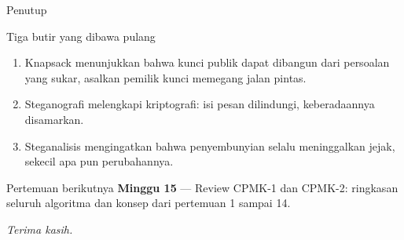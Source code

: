 \documentclass[aspectratio=169,11pt]{beamer}
\begin{document}
\begin{frame}{Penutup}
    \begin{block}{Tiga butir yang dibawa pulang}
        \footnotesize
        \begin{enumerate}
            \item Knapsack menunjukkan bahwa kunci publik dapat dibangun dari
                  persoalan yang sukar, asalkan pemilik kunci memegang jalan
                  pintas.
            \item Steganografi melengkapi kriptografi: isi pesan dilindungi,
                  keberadaannya disamarkan.
            \item Steganalisis mengingatkan bahwa penyembunyian selalu
                  meninggalkan jejak, sekecil apa pun perubahannya.
        \end{enumerate}
    \end{block}
    \vspace{0.2cm}
    \begin{exampleblock}{Pertemuan berikutnya}
        \textbf{Minggu 15} --- Review CPMK-1 dan CPMK-2: ringkasan seluruh
        algoritma dan konsep dari pertemuan 1 sampai 14.
    \end{exampleblock}
    \vspace{0.2cm}
    \centering
    \textit{Terima kasih.}
\end{frame}
\end{document}
